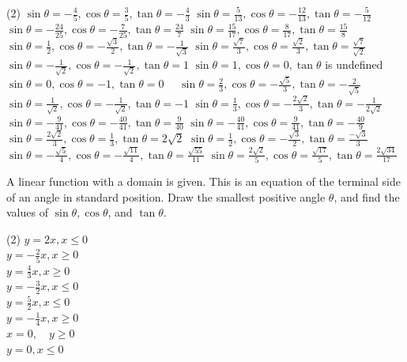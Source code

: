 \documentclass[12pt,fleqn]{book}
\newcommand{\prb}[1]{\begin{Exercise}\parbox[t]{\textwidth-5em}{#1}\end{Exercise}}
\newcommand{\sol}[1]{\begin{Answer}\parbox[t]{\textwidth-5em}{#1}\end{Answer}}
\begin{document}
\sol{
	\begin{tasks}(2)
		\task $\sin \theta=-\frac{4}{5}, \cos \theta=\frac{3}{5}, \tan \theta=-\frac{4}{3}$
		\task $\sin \theta=\frac{5}{13}, \cos \theta=-\frac{12}{13}, \tan \theta=-\frac{5}{12}$
		\task $\sin \theta=-\frac{24}{25}, \cos \theta=-\frac{7}{25}, \tan \theta=\frac{24}{7}$
		\task $\sin \theta=\frac{15}{17}, \cos \theta=\frac{8}{17}, \tan \theta=\frac{15}{8}$
		\task $\sin \theta=\frac{1}{2}, \cos \theta=-\frac{\sqrt{3}}{2}, \tan \theta=-\frac{1}{\sqrt{3}}$
		\task $\sin \theta=\frac{\sqrt{7}}{3}, \cos \theta=\frac{\sqrt{2}}{3}, \tan \theta=\frac{\sqrt{7}}{\sqrt{2}}$
		\task $\sin \theta=-\frac{1}{\sqrt{2}}, \cos \theta=-\frac{1}{\sqrt{2}}, \tan \theta=1$
		\task $\sin \theta=1, \cos \theta=0, \tan \theta$ is undefined
		\task $\sin \theta=0, \cos \theta=-1, \tan \theta=0 \quad$
		\task $\sin \theta=\frac{2}{3}, \cos \theta=-\frac{\sqrt{5}}{3}, \tan \theta=-\frac{2}{\sqrt{5}}$
		\task $\sin \theta=\frac{1}{\sqrt{2}}, \cos \theta=-\frac{1}{\sqrt{2}}, \tan \theta=-1$
		\task $\sin \theta=\frac{1}{3}, \cos \theta=-\frac{2 \sqrt{2}}{3}, \tan \theta=-\frac{1}{2 \sqrt{2}}$
		\task $\sin \theta=-\frac{9}{41}, \cos \theta=-\frac{40}{41}, \tan \theta=\frac{9}{40}$
		\task $\sin \theta=-\frac{40}{41}, \cos \theta=\frac{9}{41}, \tan \theta=-\frac{40}{9}$
		\task $\sin \theta=\frac{2 \sqrt{2}}{3}, \cos \theta=\frac{1}{3}, \tan \theta=2 \sqrt{2}$
		\task $\sin \theta=\frac{1}{2}, \cos \theta=-\frac{\sqrt{3}}{2}, \tan \theta=\frac{-\sqrt{3}}{3}$
		\task $\sin \theta=-\frac{\sqrt{5}}{4}, \cos \theta=-\frac{\sqrt{11}}{4}, \tan \theta=\frac{\sqrt{55}}{11}$
		\task $\sin \theta=\frac{2 \sqrt{2}}{5}, \cos \theta=\frac{\sqrt{17}}{5}, \tan \theta=\frac{2 \sqrt{34}}{17}$
	\end{tasks}
}
\prb{
	A linear function with a domain is given. This is an equation of the terminal side of an angle in standard position. Draw the smallest positive angle $\theta$, and find the values of $\sin \theta, \cos \theta$, and $\tan \theta$.
	\begin{tasks}(2)
		\task $y=2 x, x \leq 0$
		\\ \blankaxes{2.5}{2.5}
		\task $y=-\frac{2}{5} x, x \geq 0$
		\\ \blankaxes{2.5}{2.5}
		\task $y=\frac{4}{3} x, x \geq 0$
		\\ \blankaxes{2.5}{2.5}
		\task $y=-\frac{3}{2} x, x \leq 0$
		\\ \blankaxes{2.5}{2.5}
		\task $y=\frac{5}{2} x, x \leq 0$
		\\ \blankaxes{2.5}{2.5}
		\task $y=-\frac{1}{4} x, x \geq 0$
		\\ \blankaxes{2.5}{2.5}
		\task $x=0, \quad y \geq 0$
		\\ \blankaxes{2.5}{2.5}
		\task $y=0, x \leq 0$
		\\ \blankaxes{2.5}{2.5}
	\end{tasks}
}
\end{document}
